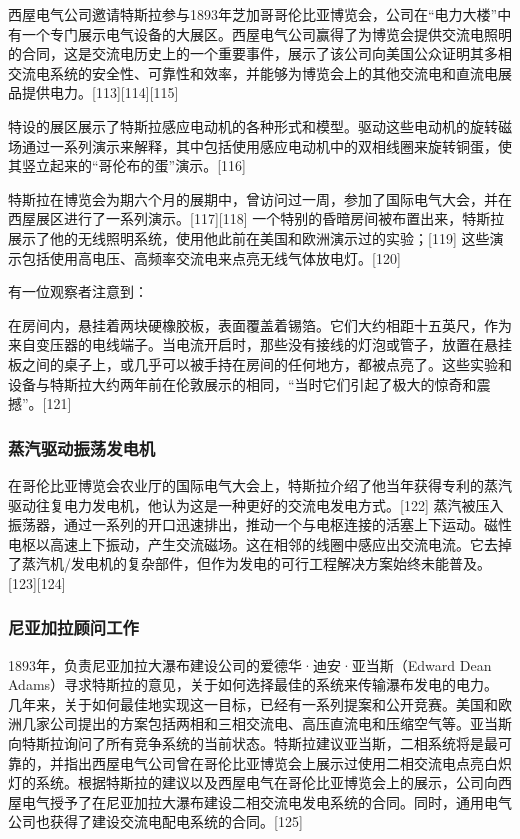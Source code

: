 西屋电气公司邀请特斯拉参与1893年芝加哥哥伦比亚博览会，公司在“电力大楼”中有一个专门展示电气设备的大展区。西屋电气公司赢得了为博览会提供交流电照明的合同，这是交流电历史上的一个重要事件，展示了该公司向美国公众证明其多相交流电系统的安全性、可靠性和效率，并能够为博览会上的其他交流电和直流电展品提供电力。[113][114][115]

特设的展区展示了特斯拉感应电动机的各种形式和模型。驱动这些电动机的旋转磁场通过一系列演示来解释，其中包括使用感应电动机中的双相线圈来旋转铜蛋，使其竖立起来的“哥伦布的蛋”演示。[116]

特斯拉在博览会为期六个月的展期中，曾访问过一周，参加了国际电气大会，并在西屋展区进行了一系列演示。[117][118] 一个特别的昏暗房间被布置出来，特斯拉展示了他的无线照明系统，使用他此前在美国和欧洲演示过的实验；[119] 这些演示包括使用高电压、高频率交流电来点亮无线气体放电灯。[120]

有一位观察者注意到：

在房间内，悬挂着两块硬橡胶板，表面覆盖着锡箔。它们大约相距十五英尺，作为来自变压器的电线端子。当电流开启时，那些没有接线的灯泡或管子，放置在悬挂板之间的桌子上，或几乎可以被手持在房间的任何地方，都被点亮了。这些实验和设备与特斯拉大约两年前在伦敦展示的相同，“当时它们引起了极大的惊奇和震撼”。[121]
\subsubsection{蒸汽驱动振荡发电机}  
在哥伦比亚博览会农业厅的国际电气大会上，特斯拉介绍了他当年获得专利的蒸汽驱动往复电力发电机，他认为这是一种更好的交流电发电方式。[122] 蒸汽被压入振荡器，通过一系列的开口迅速排出，推动一个与电枢连接的活塞上下运动。磁性电枢以高速上下振动，产生交流磁场。这在相邻的线圈中感应出交流电流。它去掉了蒸汽机/发电机的复杂部件，但作为发电的可行工程解决方案始终未能普及。[123][124]
\subsubsection{尼亚加拉顾问工作}  
1893年，负责尼亚加拉大瀑布建设公司的爱德华·迪安·亚当斯（Edward Dean Adams）寻求特斯拉的意见，关于如何选择最佳的系统来传输瀑布发电的电力。几年来，关于如何最佳地实现这一目标，已经有一系列提案和公开竞赛。美国和欧洲几家公司提出的方案包括两相和三相交流电、高压直流电和压缩空气等。亚当斯向特斯拉询问了所有竞争系统的当前状态。特斯拉建议亚当斯，二相系统将是最可靠的，并指出西屋电气公司曾在哥伦比亚博览会上展示过使用二相交流电点亮白炽灯的系统。根据特斯拉的建议以及西屋电气在哥伦比亚博览会上的展示，公司向西屋电气授予了在尼亚加拉大瀑布建设二相交流电发电系统的合同。同时，通用电气公司也获得了建设交流电配电系统的合同。[125]
